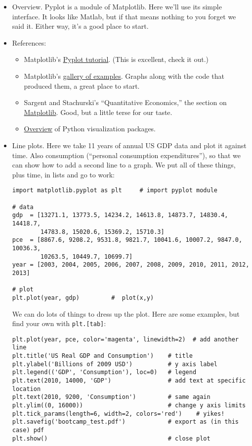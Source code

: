 \documentclass[11pt]{article}
\begin{document}
\begin{itemize}
\item Overview.  Pyplot is a module of Matplotlib.
Here we'll use its simple interface.
It looks like Matlab, but if that means nothing to you forget we said it.
Either way, it's a good place to start.

\item References:
\begin{itemize}
\item Matplotlib's
\href{http://matplotlib.org/users/pyplot_tutorial.html}{Pyplot tutorial}.
(This is excellent, check it out.)
\item Matplotlib's
\href{http://matplotlib.org/gallery.html}{gallery of examples}.
Graphs along with the code that produced them, a great place to start.
\item Sargent and Stachurski's ``Quantitative Economics,''
the section on
\href{http://quant-econ.net/py/matplotlib.html}{Matplotlib}.
Good, but a little terse for our taste.
\item \href{http://pbpython.com/visualization-tools-1.html}{Overview} of Python visualization packages.
\end{itemize}

\item Line plots.
Here we take 11 years of annual US GDP data and plot it against time.
Also consumption (``personal consumption expenditures''), so that we can
show how to add a second line to a graph.
We put all of these things, plus time, in lists and go to work:
\begin{verbatim}
import matplotlib.pyplot as plt     # import pyplot module

# data
gdp  = [13271.1, 13773.5, 14234.2, 14613.8, 14873.7, 14830.4, 14418.7,
        14783.8, 15020.6, 15369.2, 15710.3]
pce  = [8867.6, 9208.2, 9531.8, 9821.7, 10041.6, 10007.2, 9847.0, 10036.3,
        10263.5, 10449.7, 10699.7]
year = [2003, 2004, 2005, 2006, 2007, 2008, 2009, 2010, 2011, 2012, 2013]

# plot
plt.plot(year, gdp)         #  plot(x,y)
\end{verbatim}
We can do lots of things to dress up the plot.
Here are some examples, but find your own with {\tt plt.[tab]}:
\begin{verbatim}
plt.plot(year, pce, color='magenta', linewidth=2)  # add another line
plt.title('US Real GDP and Consumption')    # title
plt.ylabel('Billions of 2009 USD')          # y axis label
plt.legend(('GDP', 'Consumption'), loc=0)   # legend
plt.text(2010, 14000, 'GDP')                # add text at specific location
plt.text(2010, 9200, 'Consumption')         # same again
plt.ylim((0, 16000))                        # change y axis limits
plt.tick_params(length=6, width=2, colors='red')    # yikes!
plt.savefig('bootcamp_test.pdf')            # export as (in this case) pdf
plt.show()                                  # close plot
\end{verbatim}


\end{itemize}
\end{document}
